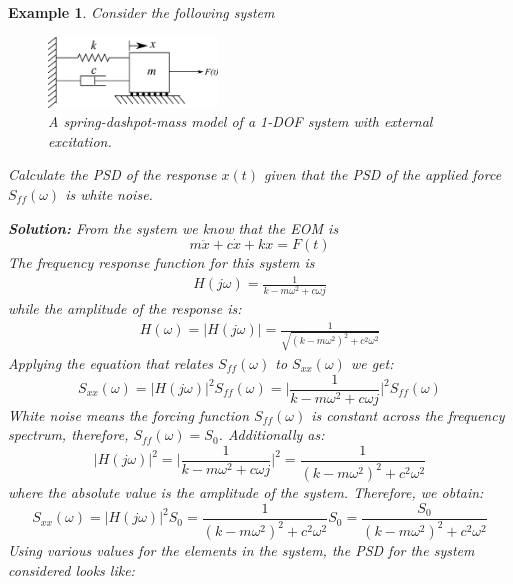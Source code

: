 \documentclass[12pt,letter]{article}
\newtheorem{ex}{Example}
\numberwithin{ex}{section} %
\newenvironment{example}{\begin{mdframed}[middlelinewidth=0.5mm]\begin{ex}\normalfont}{\end{ex}\end{mdframed}}
\numberwithin{re}{section} %
\begin{document}
\begin{example}
	Consider the following system
	\begin{figure}[H]
		\centering
		\includegraphics[width=0.4\textwidth]{../Figures/forced_spring_mass_damper_system.png}
		\caption{A spring-dashpot-mass model of a 1-DOF system with external excitation.}
	\end{figure}
	Calculate the PSD of the response $x(t)$ given that the PSD of the applied force $S_{ff}(\omega)$ is white noise. 
	
	\noindent\textbf{Solution:} From the system we know that the EOM is 
	\begin{equation}
	m\ddot{x} +c\dot{x} + kx = F(t)
	\end{equation} 
	The frequency response function for this system is 
	\begin{eqnarray}
		H(j\omega) = \frac{1}{k-m\omega^2+c\omega j}
	\end{eqnarray}
	while the amplitude of the response is:
	\begin{eqnarray}
	H(\omega) = |H(j\omega)| = \frac{1}{\sqrt{(k-m\omega^2)^2+c^2\omega^2}}
	\end{eqnarray}
	Applying the equation that relates $S_{ff}(\omega)$ to $S_{xx}(\omega)$ we get:
	\begin{equation}
	S_{xx}(\omega) =  |H(j\omega)|^2 S_{ff}(\omega) = \bigg|\frac{1}{k-m\omega^2+c\omega j} \bigg|^2 S_{ff}(\omega) 
	\end{equation}
	White noise means the forcing function $S_{ff}(\omega)$ is constant across the frequency spectrum, therefore, $S_{ff}(\omega)=S_0$. Additionally as:
	\begin{equation}
	|H(j\omega)|^2 = \bigg|\frac{1}{k-m\omega^2+c\omega j} \bigg|^2 = \frac{1}{(k-m\omega^2)^2+c^2\omega^2}
	\end{equation}
	where the absolute value is the amplitude of the system. Therefore, we obtain:
	\begin{equation}
	S_{xx}(\omega) =  |H(j\omega)|^2 S_{0}= \frac{1}{(k-m\omega^2)^2+c^2\omega^2}S_0 = \frac{S_0}{(k-m\omega^2)^2+c^2\omega^2}
	\end{equation}
	Using various values for the elements in the system, the PSD for the system considered looks like:
	\begin{figure}[H]

\end{figure}
\end{example}
\end{document}
